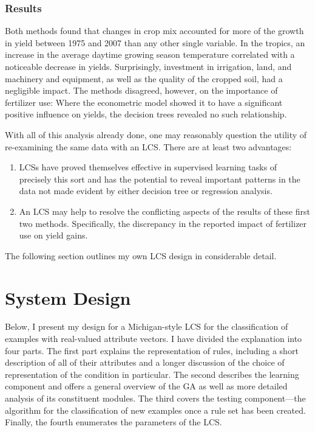 \documentclass[11pt]{article}
\begin{document}
\subsubsection{Results}
Both methods found that changes in crop mix accounted for more of the growth in yield between 1975 and 2007 than any other single variable. In the tropics, an increase in the average daytime growing season temperature correlated with a noticeable decrease in yields. Surprisingly, investment in irrigation, land, and machinery and equipment, as well as the quality of the cropped soil, had a negligible impact. The methods disagreed, however, on the importance of fertilizer use: Where the econometric model showed it to have a significant positive influence on yields, the decision trees revealed no such relationship.

With all of this analysis already done, one may reasonably question the utility of re-examining the same data with an LCS. There are at least two advantages:
\begin{enumerate}
\item LCSs have proved themselves effective in supervised learning tasks of precisely this sort and has the potential to reveal important patterns in the data not made evident by either decision tree or regression analysis.
\item An LCS may help to resolve the conflicting aspects of the results of these first two methods. Specifically, the discrepancy in the reported impact of fertilizer use on yield gains.
\end{enumerate}
The following section outlines my own LCS design in considerable detail.

\section{System Design}

Below, I present my design for a Michigan-style LCS for the classification of examples with real-valued attribute vectors. I have divided the explanation into four parts. The first part explains the representation of rules, including a short description of all of their attributes and a longer discussion of the choice of representation of the condition in particular. The second describes the learning component and offers a general overview of the GA as well as more detailed analysis of its constituent modules. The third covers the testing component---the algorithm for the classification of new examples once a rule set has been created. Finally, the fourth enumerates the parameters of the LCS.
\end{document}
